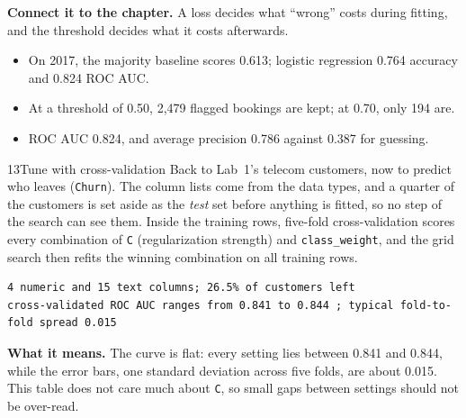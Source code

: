 \textbf{Connect it to the chapter.} A loss decides what ``wrong'' costs during fitting, and the threshold decides what it costs afterwards.


\begin{labcheckpoint}
\begin{itemize}[leftmargin=1.2em,itemsep=2pt,topsep=1pt]
  \item On 2017, the majority baseline scores 0.613; logistic regression 0.764 accuracy and 0.824 ROC AUC.
  \item At a threshold of 0.50, 2,479 flagged bookings are kept; at 0.70, only 194 are.
  \item ROC AUC 0.824, and average precision 0.786 against 0.387 for guessing.
\end{itemize}
\end{labcheckpoint}


\begin{labquestion}{13}{Tune with cross-validation}
Back to Lab~1's telecom customers, now to predict who leaves (\texttt{Churn}). The column lists come from the data types, and a quarter of the customers is set aside as the \emph{test} set before anything is fitted, so no step of the search can see them. Inside the training rows, five-fold cross-validation scores every combination of \texttt{C} (regularization strength) and \texttt{class\_weight}, and the grid search then refits the winning combination on all training rows.
\end{labquestion}
\begin{labanswer}

\begin{refoutput}
\begin{lstlisting}[style=utpterminal]
4 numeric and 15 text columns; 26.5% of customers left
cross-validated ROC AUC ranges from 0.841 to 0.844 ; typical fold-to-fold spread 0.015
\end{lstlisting}
\end{refoutput}

\textbf{What it means.} The curve is flat: every setting lies between 0.841 and 0.844, while the error bars, one standard deviation across five folds, are about 0.015. This table does not care much about \texttt{C}, so small gaps between settings should not be over-read.
\end{labanswer}

